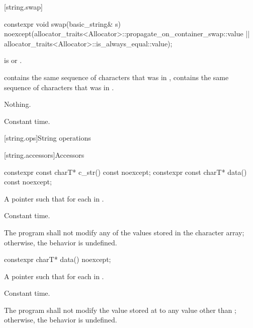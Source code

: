 [string.swap]{}

%
\begin{itemdecl}
constexpr void swap(basic_string& s)
  noexcept(allocator_traits<Allocator>::propagate_on_container_swap::value ||
           allocator_traits<Allocator>::is_always_equal::value);
\end{itemdecl}

\begin{itemdescr}
\pnum
\expects
{} is 
or
.

\pnum
\ensures
{}
contains the same sequence of characters that was in ,
 contains the same sequence of characters that was in
.

\pnum
\throws
Nothing.

\pnum
\complexity
Constant time.
\end{itemdescr}

[string.ops]{String operations}

[string.accessors]{Accessors}

%
%
\begin{itemdecl}
constexpr const charT* c_str() const noexcept;
constexpr const charT* data() const noexcept;
\end{itemdecl}

\begin{itemdescr}
\pnum
\returns
A pointer  such that  for each
 in .

\pnum
\complexity
Constant time.

\pnum
\remarks
The program shall not modify any of the values stored in the character array; otherwise, the behavior is undefined.
\end{itemdescr}

%
\begin{itemdecl}
constexpr charT* data() noexcept;
\end{itemdecl}

\begin{itemdescr}
\pnum
\returns
A pointer  such that  for each
 in .

\pnum
\complexity
Constant time.

\pnum
\remarks
The program shall not modify the value stored at 
to any value other than ; otherwise, the behavior is undefined.
\end{itemdescr}

